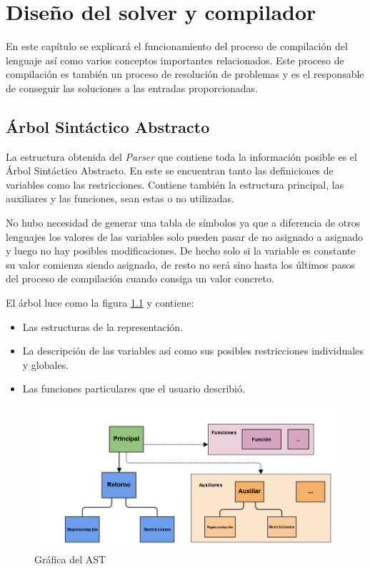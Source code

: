 \chapter{Diseño del solver y compilador}\label{chapter:dise_solver_compilador}

En este capítulo se explicará el funcionamiento del proceso
de compilación del lenguaje así como varios conceptos importantes relacionados.
Este proceso de compilación es también un proceso de resolución de problemas y
es el responsable de conseguir las soluciones a las entradas proporcionadas.

\section{Árbol Sintáctico Abstracto}
La estructura obtenida del \textit{Parser} que contiene toda la información posible es 
el Árbol Sintáctico Abstracto. En este se encuentran tanto las definiciones de 
variables como las restricciones. Contiene también la estructura principal, 
las auxiliares y las funciones, sean estas o no utilizadas.

No hubo necesidad de generar una tabla de símbolos ya que a diferencia de 
otros lenguajes los valores de las variables solo pueden pasar de no asignado a 
asignado y luego no hay posibles modificaciones. De hecho solo si la variable es 
constante su valor comienza siendo asignado, de resto no será sino hasta los últimos 
pasos del proceso de compilación cuando consiga un valor concreto.

El árbol luce como la figura \ref{fig:ast} y contiene:

\begin{itemize}
 \item {Las estructuras de la representación.}
 \item {La descripción de las variables así como sus posibles restricciones 
	individuales y globales.}
 \item {Las funciones particulares que el usuario describió.}
\end{itemize}

\begin{figure}[h]
	\begin{center}
		\includegraphics[scale=0.55]{imagenes/AST.png}
	\end{center}
	\caption{
		\label{fig:ast}
		Gráfica del AST
	}
\end{figure}

